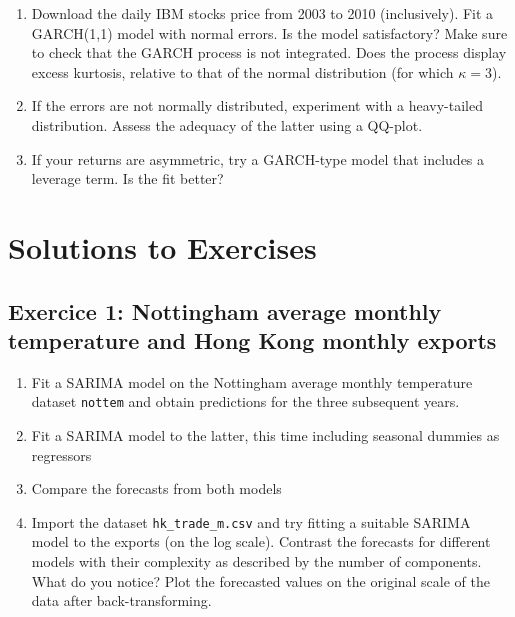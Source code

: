 \documentclass[]{book}
\providecommand{\tightlist}{%
  \setlength{\itemsep}{0pt}\setlength{\parskip}{0pt}}
\begin{document}
\begin{enumerate}
\def\labelenumi{\arabic{enumi}.}
\tightlist
\item
  Download the daily IBM stocks price from 2003 to 2010 (inclusively). Fit a GARCH(1,1) model with normal errors. Is the model satisfactory? Make sure to check that the GARCH process is not integrated. Does the process display excess kurtosis, relative to that of the normal distribution (for which \(\kappa=3\)).
\item
  If the errors are not normally distributed, experiment with a heavy-tailed distribution. Assess the adequacy of the latter using a QQ-plot.
\item
  If your returns are asymmetric, try a GARCH-type model that includes a leverage term. Is the fit better?
\end{enumerate}

\hypertarget{solutions-to-exercises-2}{%
\section{Solutions to Exercises}\label{solutions-to-exercises-2}}

\hypertarget{exercice-1-nottingham-average-monthly-temperature-and-hong-kong-monthly-exports-1}{%
\subsection{Exercice 1: Nottingham average monthly temperature and Hong Kong monthly exports}\label{exercice-1-nottingham-average-monthly-temperature-and-hong-kong-monthly-exports-1}}

\begin{enumerate}
\def\labelenumi{\arabic{enumi}.}
\tightlist
\item
  Fit a SARIMA model on the Nottingham average monthly temperature dataset \texttt{nottem} and obtain predictions for the three subsequent years.
\item
  Fit a SARIMA model to the latter, this time including seasonal dummies as regressors
\item
  Compare the forecasts from both models
\item
  Import the dataset \texttt{hk\_trade\_m.csv} and try fitting a suitable SARIMA model to the exports (on the log scale). Contrast the forecasts for different models with their complexity as described by the number of components. What do you notice? Plot the forecasted values on the original scale of the data after back-transforming.
\end{enumerate}
\end{document}

